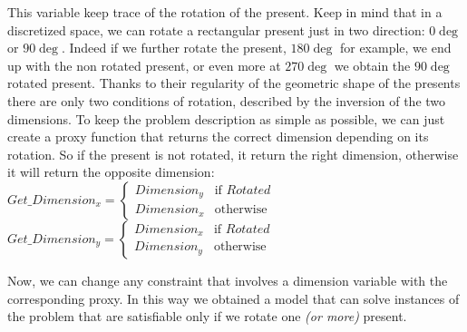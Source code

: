 This variable keep trace of the rotation of the present. Keep in mind that in a discretized space, we can rotate a rectangular present just in two direction: $0\deg$ or $90\deg$.
Indeed if we further rotate the present, $180\deg$ for example, we end up with the non rotated present, or even more at $270\deg$ we obtain the $90\deg$ rotated present.
Thanks to their regularity of the geometric shape of the presents there are only two conditions of rotation, described by the inversion of the two dimensions.
To keep the problem description as simple as possible, we can just create a proxy function that returns the correct dimension depending on its rotation.
So if the present is not rotated, it return the right dimension, otherwise it will return the opposite dimension:\\
$
Get\_Dimension_x = 
\begin{cases}
	Dimension_y & \text{if } Rotated \\
	Dimension_x & \text{otherwise}
\end{cases}
$
\\
$
Get\_Dimension_y = 
\begin{cases}
	Dimension_x & \text{if } Rotated \\
	Dimension_y & \text{otherwise}
\end{cases}
$

Now, we can change any constraint that involves a dimension variable with the corresponding proxy.
In this way we obtained a model that can solve instances of the problem that are satisfiable only if we rotate one \textit{(or more)} present.

